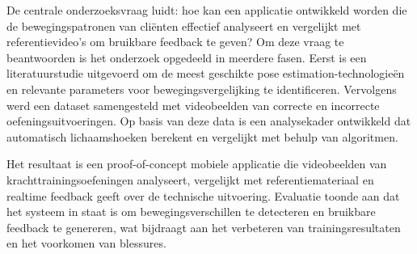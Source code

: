 De centrale onderzoeksvraag luidt: hoe kan een applicatie ontwikkeld worden die de bewegingspatronen van cliënten effectief analyseert en vergelijkt met referentievideo’s om bruikbare feedback te geven? Om deze vraag te beantwoorden is het onderzoek opgedeeld in meerdere fasen. 
Eerst is een literatuurstudie uitgevoerd om de meest geschikte pose estimation-technologieën en relevante parameters voor bewegingsvergelijking te identificeren. 
Vervolgens werd een dataset samengesteld met videobeelden van correcte en incorrecte oefeningsuitvoeringen. 
Op basis van deze data is een analysekader ontwikkeld dat automatisch lichaamshoeken berekent en vergelijkt met behulp van algoritmen.

Het resultaat is een proof-of-concept mobiele applicatie die videobeelden van krachttrainingsoefeningen analyseert, vergelijkt met referentiemateriaal en realtime feedback geeft over de technische uitvoering. 
Evaluatie toonde aan dat het systeem in staat is om bewegingsverschillen te detecteren en bruikbare feedback te genereren, wat bijdraagt aan het verbeteren van trainingsresultaten en het voorkomen van blessures.

